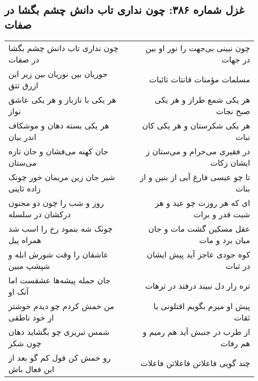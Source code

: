 \begin{center}
\section*{غزل شماره ۳۸۶: چون نداری تاب دانش چشم بگشا در صفات}
\label{sec:0386}
\begin{longtable}{l p{0.5cm} r}
چون نداری تاب دانش چشم بگشا در صفات
&&
چون نبینی بی‌جهت را نور او بین در جهات
\\
حوریان بین نوریان بین زیر این ازرق تتق
&&
مسلمات مؤمنات قانتات تائبات
\\
هر یکی با نازباز و هر یکی عاشق نواز
&&
هر یکی شمع طراز و هر یکی صبح نجات
\\
هر یکی بسته دهان و موشکاف اندر بیان
&&
هر یکی شکرستان و هر یکی کان نبات
\\
جان کهنه می‌فشان و جان تازه می‌ستان
&&
در فقیری می‌خرام و می‌ستان ز ایشان زکات
\\
شیر جان زین مریمان خور چونک زاده ثاینی
&&
تا چو عیسی فارغ آیی از بنین و از بنات
\\
روز و شب را چون دو مجنون درکشان در سلسله
&&
ای که هر روزت چو عید و هر شبت قدر و برات
\\
چونک شه بنمود رخ را اسب شد همراه پیل
&&
عقل مسکین گشت مات و جان میان برد و مات
\\
عاشقان را وقت شورش ابله و شپشپ مبین
&&
کوه جودی عاجز آید پیش ایشان در ثبات
\\
جان جمله پیشه‌ها عشقست اما آنک او
&&
تره زار دل نبیند درفتد در ترهات
\\
من خمش کردم چو دیدم خوشتر از خود ناطقی
&&
پیش او میرم بگویم اقتلونی یا ثقات
\\
شمس تبریزی چو بگشاید دهان چون شکر
&&
از طرب در جنبش آید هم رمیم و هم رفات
\\
رو خمش کن قول کم گو بعد از این فعال باش
&&
چند گویی فاعلاتن فاعلاتن فاعلات
\\
\end{longtable}
\end{center}
